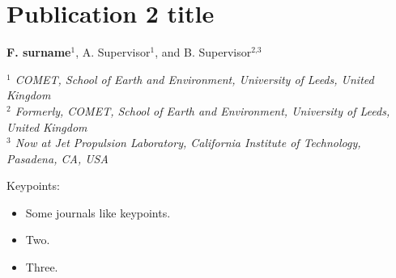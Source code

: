 \onehalfspacing
\chapter[Publication 2 title]{Publication 2 title}
\label{ch:publication2}
\begin{center}
 \large{\textbf{F. surname}$^{\text{1}}$, A. Supervisor$^{\text{1}}$, and B. Supervisor$^{\text{2,3}}$}  \\
\end{center}
\begin{center}
\textit{
$^{\text{1}}$ COMET, School of Earth and Environment, University of Leeds, United Kingdom\\
$^{\text{2}}$ Formerly, COMET, School of Earth and Environment, University of Leeds, United Kingdom\\
$^{\text{3}}$ Now at Jet Propulsion Laboratory, California Institute of Technology, Pasadena, CA, USA\\
}
\end{center}

\newpage
Keypoints:
\begin{itemize}
\item Some journals like keypoints.
\item Two.
\item Three.
\end{itemize}



